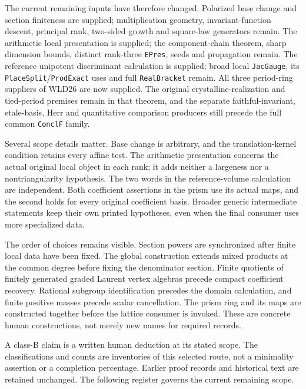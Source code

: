 \documentclass[11pt,a4paper]{article}
\numberwithin{equation}{section}
\theoremstyle{remark}\newtheorem{remark}[theorem]{Remark}
\begin{document}
The current remaining inputs have therefore changed. Polarized base
change and section finiteness are supplied; multiplication geometry,
invariant-function descent, principal rank, two-sided growth and
square-law generators remain. The arithmetic local presentation is
supplied; the component-chain theorem, sharp dimension bounds, distinct
rank-three \texttt{EPres}, seeds and propagation remain. The reference
unipotent discriminant calculation is supplied; broad local
\texttt{Jac\allowbreak Gauge}, its \texttt{Place\allowbreak Split}/\texttt{Prod\allowbreak Exact} uses
and full \texttt{Real\allowbreak Bracket} remain. All three period-ring suppliers
of WLD26 are now supplied. The original crystalline-realization and
tied-period premises remain in that theorem, and the separate
faithful-invariant, etale-basis, Herr and quantitative comparison
producers still precede the full common \texttt{Concl\allowbreak F} family.

Several scope details matter. Base change is arbitrary, and the
translation-kernel condition retains every affine test. The arithmetic
presentation concerns the actual original local object in each rank;
it adds neither a largeness nor a nontriangularity hypothesis.
The two words in the reference-volume calculation are independent.
Both coefficient assertions in the prism use its actual maps, and
the second holds for every original coefficient basis. Broader generic
intermediate statements keep their own printed hypotheses, even when
the final consumer uses more specialized data.

The order of choices remains visible. Section powers are synchronized
after finite local data have been fixed. The global construction extends
mixed products at the common degree before fixing the denominator section.
Finite quotients of finitely generated graded Laurent vertex algebras
precede compact coefficient recovery. Rational subgroup identification
precedes the domain calculation, and finite positive masses precede
scalar cancellation. The prism ring and its maps are constructed
together before the lattice consumer is invoked. These are concrete
human constructions, not merely new names for required records.

A class-B claim is a written human deduction at its stated scope.
The classifications and counts are inventories of this selected route,
not a minimality assertion or a completion percentage. Earlier proof
records and historical text are retained unchanged. The following
register governs the current remaining scope.
\end{document}
